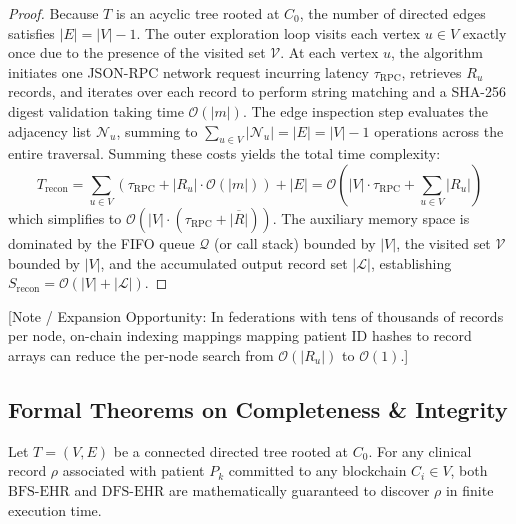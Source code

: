 \begin{proof}
Because $T$ is an acyclic tree rooted at $C_0$, the number of directed edges satisfies $|E| = |V| - 1$. The outer exploration loop visits each vertex $u \in V$ exactly once due to the presence of the visited set $\mathcal{V}$. At each vertex $u$, the algorithm initiates one JSON-RPC network request incurring latency $\tau_{\text{RPC}}$, retrieves $R_u$ records, and iterates over each record to perform string matching and a SHA-256 digest validation taking time $\mathcal{O}(|m|)$. The edge inspection step evaluates the adjacency list $\mathcal{N}_u$, summing to $\sum_{u \in V} |\mathcal{N}_u| = |E| = |V| - 1$ operations across the entire traversal. Summing these costs yields the total time complexity:
\begin{equation}
T_{\text{recon}} = \sum_{u \in V} \left( \tau_{\text{RPC}} + |R_u| \cdot \mathcal{O}(|m|) \right) + |E| = \mathcal{O}\left(|V| \cdot \tau_{\text{RPC}} + \sum_{u \in V} |R_u|\right)
\end{equation}
which simplifies to $\mathcal{O}(|V| \cdot (\tau_{\text{RPC}} + \overline{|R|}))$. The auxiliary memory space is dominated by the FIFO queue $\mathcal{Q}$ (or call stack) bounded by $|V|$, the visited set $\mathcal{V}$ bounded by $|V|$, and the accumulated output record set $|\mathcal{L}|$, establishing $S_{\text{recon}} = \mathcal{O}(|V| + |\mathcal{L}|)$.
\end{proof}

[Note / Expansion Opportunity: In federations with tens of thousands of records per node, on-chain indexing mappings mapping patient ID hashes to record arrays can reduce the per-node search from $\mathcal{O}(|R_u|)$ to $\mathcal{O}(1)$.]

\subsection{Formal Theorems on Completeness & Integrity}

\begin{theorem}
\label{thm:reconstruction_completeness}
Let $T = (V, E)$ be a connected directed tree rooted at $C_0$. For any clinical record $\rho$ associated with patient $P_k$ committed to any blockchain $C_i \in V$, both $\text{BFS-EHR}$ and $\text{DFS-EHR}$ are mathematically guaranteed to discover $\rho$ in finite execution time.
\end{theorem}

